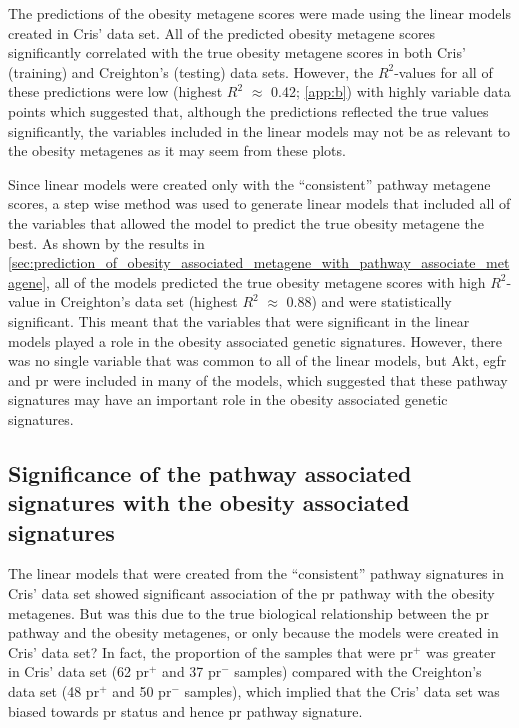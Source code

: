 The predictions of the obesity metagene scores were made using the linear models created in Cris' data set.
All of the predicted obesity metagene scores significantly correlated with the true obesity metagene scores in both Cris' (training) and Creighton's (testing) data sets.
However, the $R^2$-values for all of these predictions were low (highest $R^2$ $\approx$ 0.42; \cref{app:b}) with highly variable data points which suggested that, although the predictions reflected the true values significantly, the variables included in the linear models may not be as relevant to the obesity metagenes as it may seem from these plots.

Since linear models were created only with the ``consistent'' pathway metagene scores, a step wise method was used to generate linear models that included all of the variables that allowed the model to predict the true obesity metagene the best.
As shown by the results in \cref{sec:prediction_of_obesity_associated_metagene_with_pathway_associate_metagene}, all of the models predicted the true obesity metagene scores with high $R^2$-value in Creighton's data set (highest $R^2$ $\approx$ 0.88) and were statistically significant.
This meant that the variables that were significant in the linear models played a role in the obesity associated genetic signatures.
However, there was no single variable that was common to all of the linear models, but Akt, \gls{egfr} and \gls{pr} were included in many of the models, which suggested that these pathway signatures may have an important role in the obesity associated genetic signatures.

\subsection{Significance of the pathway associated signatures with the obesity associated signatures}
\label{sub:significance_of_pr_pathway}

The linear models that were created from the ``consistent'' pathway signatures in Cris' data set showed significant association of the \gls{pr} pathway with the obesity metagenes.
But was this due to the true biological relationship between the \gls{pr} pathway and the obesity metagenes, or only because the models were created in Cris' data set?
In fact, the proportion of the samples that were \gls{pr}$^+$ was greater in Cris' data set (62 \gls{pr}$^+$ and 37 \gls{pr}$^-$ samples) compared with the Creighton's data set (48 \gls{pr}$^+$ and 50 \gls{pr}$^-$ samples), which implied that the Cris' data set was biased towards \gls{pr} status and hence \gls{pr} pathway signature.

